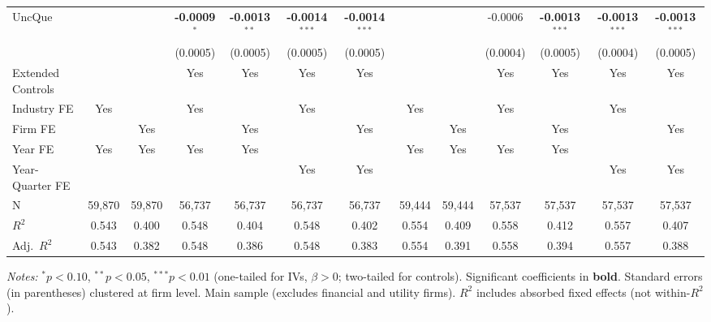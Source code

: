 \documentclass[11pt,a4paper]{article}
\begin{document}
\begin{table}[htbp]
\begin{tabular}{lcccccccccccc}
UncQue &  &  & \textbf{-0.0009}$^{*}$ & \textbf{-0.0013}$^{**}$ & \textbf{-0.0014}$^{***}$ & \textbf{-0.0014}$^{***}$ &  &  & -0.0006 & \textbf{-0.0013}$^{***}$ & \textbf{-0.0013}$^{***}$ & \textbf{-0.0013}$^{***}$ \\
 &  &  & (0.0005) & (0.0005) & (0.0005) & (0.0005) &  &  & (0.0004) & (0.0005) & (0.0004) & (0.0005) \\
\midrule
Extended Controls &  &  & Yes & Yes & Yes & Yes &  &  & Yes & Yes & Yes & Yes \\
Industry FE & Yes &  & Yes &  & Yes &  & Yes &  & Yes &  & Yes &  \\
Firm FE &  & Yes &  & Yes &  & Yes &  & Yes &  & Yes &  & Yes \\
Year FE & Yes & Yes & Yes & Yes &  &  & Yes & Yes & Yes & Yes &  &  \\
Year-Quarter FE &  &  &  &  & Yes & Yes &  &  &  &  & Yes & Yes \\
\midrule
N & 59,870 & 59,870 & 56,737 & 56,737 & 56,737 & 56,737 & 59,444 & 59,444 & 57,537 & 57,537 & 57,537 & 57,537 \\
$R^2$ & 0.543 & 0.400 & 0.548 & 0.404 & 0.548 & 0.402 & 0.554 & 0.409 & 0.558 & 0.412 & 0.557 & 0.407 \\
Adj.~$R^2$ & 0.543 & 0.382 & 0.548 & 0.386 & 0.548 & 0.383 & 0.554 & 0.391 & 0.558 & 0.394 & 0.557 & 0.388 \\
\bottomrule
\end{tabular}
\begin{minipage}{\linewidth}
\vspace{2pt}\scriptsize
\textit{Notes:} $^{*}p<0.10$, $^{**}p<0.05$, $^{***}p<0.01$ (one-tailed for IVs, $\beta > 0$; two-tailed for controls).
 Significant coefficients in \textbf{bold}.
 Standard errors (in parentheses) clustered at firm level.
 Main sample (excludes financial and utility firms).
 $R^2$ includes absorbed fixed effects (not within-$R^2$).
\end{minipage}
\end{table}
\clearpage
\end{document}
